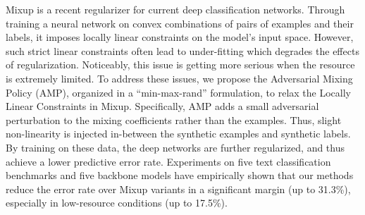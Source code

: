 Mixup is a recent regularizer for current deep classification networks. Through training a neural network on convex combinations of pairs of examples and their labels, it imposes locally linear constraints on the model's input space. However, such strict linear constraints often lead to under-fitting which degrades the effects of regularization. Noticeably, this issue is getting more serious when the resource is extremely limited. To address these issues, we propose the Adversarial Mixing Policy (AMP), organized in a ``min-max-rand'' formulation, to relax the Locally Linear Constraints in Mixup. Specifically, AMP adds a small adversarial perturbation to the mixing coefficients rather than the examples. Thus, slight non-linearity is injected in-between the synthetic examples and synthetic labels. By training on these data, the deep networks are further regularized, and thus achieve a lower predictive error rate. Experiments on five text classification benchmarks and five backbone models have empirically shown that our methods reduce the error rate over Mixup variants in a significant margin (up to 31.3\%), especially in low-resource conditions (up to 17.5\%).
